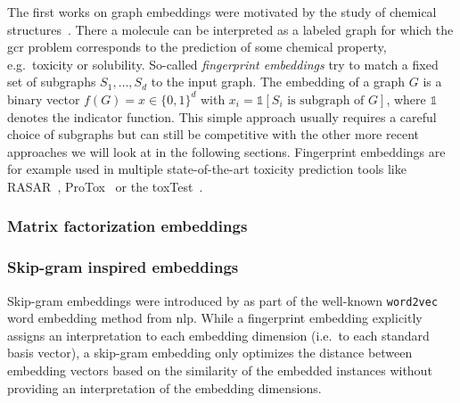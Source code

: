 The first works on graph embeddings were motivated by the study of chemical structures~\cite{Adamson1973}\cite{Willett1986}.
There a molecule can be interpreted as a labeled graph for which the \ac{gcr} problem corresponds to the prediction of some chemical property, e.g.\ toxicity or solubility.
So-called \textit{fingerprint embeddings} try to match a fixed set of subgraphs $S_1, \dots, S_d$ to the input graph.
The embedding of a graph $G$ is a binary vector $f(G) = x \in {\{0, 1\}}^d$ with $x_i = \mathds{1}[\text{$S_i$ is subgraph of $G$}]$, where $\mathds{1}$ denotes the indicator function.
This simple approach usually requires a careful choice of subgraphs but can still be competitive with the other more recent approaches we will look at in the following sections.
Fingerprint embeddings are for example used in multiple state-of-the-art toxicity prediction tools like RASAR~\cite{Luechtefeld2018}\cite{ToxTrack}, ProTox~\cite{Drwal2014}\cite{Banerjee2018}\cite{ProTox} or the \ac{toxTest}~\cite{TEST}.

\subsubsection{Matrix factorization embeddings}

\subsubsection{Skip-gram inspired embeddings}

Skip-gram embeddings were introduced by \citeauthor{Mikolov2013} as part of the well-known \texttt{word2vec}~\cite{Mikolov2013} word embedding method from \ac{nlp}.
While a fingerprint embedding explicitly assigns an interpretation to each embedding dimension (i.e.\ to each standard basis vector), a skip-gram embedding only optimizes the distance between embedding vectors based on the similarity of the embedded instances without providing an interpretation of the embedding dimensions.


